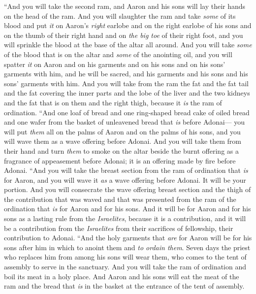 \begin{biblechapter}
\verse “And you will take the second ram, and Aaron and his sons will lay their hands on the head of the ram.
\verse And you will slaughter the ram and take \textit{some} of its blood and put \textit{it} on Aaron’s \textit{right} earlobe and on the right earlobe of his sons and on the thumb of their right hand and on \textit{the big toe} of their right foot, and you will sprinkle the blood at the base of the altar all around.
\verse And you will take \textit{some} of the blood that is on the altar and \textit{some} of the anointing oil, and you will spatter \textit{it} on Aaron and on his garments and on his sons and on his sons’ garments with him, and he will be sacred, and his garments and his sons and his sons’ garments with him.
\verse And you will take from the ram the fat and the fat tail and the fat covering the inner parts and the lobe of the liver and the two kidneys and the fat that is on them and the right thigh, because it \textit{is} the ram of ordination.
\verse “And one loaf of bread and one ring-shaped bread cake of oiled bread and one wafer from the basket of unleavened bread that \textit{is} before Adonai—
\verse you will put \textit{them} all on the palms of Aaron and on the palms of his sons, and you will wave them as a wave offering before Adonai.
\verse And you will take them from their hand and turn \textit{them} to smoke on the altar beside the burnt offering as a fragrance of appeasement before Adonai; it is an offering made by fire before Adonai.
\verse “And you will take the breast section from the ram of ordination that \textit{is} for Aaron, and you will wave it \textit{as} a wave offering before Adonai. It will be your portion.
\verse And you will consecrate the wave offering breast section and the thigh of the contribution that was waved and that was presented from the ram of the ordination that \textit{is} for Aaron and for his sons.
\verse And it will be for Aaron and for his sons as a lasting rule from the \textit{Israelites}, because it is a contribution, and it will be a contribution from the \textit{Israelites} from their sacrifices of fellowship, their contribution to Adonai.
\verse “And the holy garments that \textit{are} for Aaron will be for his sons after him in which to anoint them and \textit{to ordain them}.
\verse Seven days the priest who replaces him from among his sons will wear them, who comes to the tent of assembly to serve in the sanctuary.
\verse And you will take the ram of ordination and boil its meat in a holy place.
\verse And Aaron and his sons will eat the meat of the ram and the bread that \textit{is} in the basket at the entrance of the tent of assembly.

\end{biblechapter}
